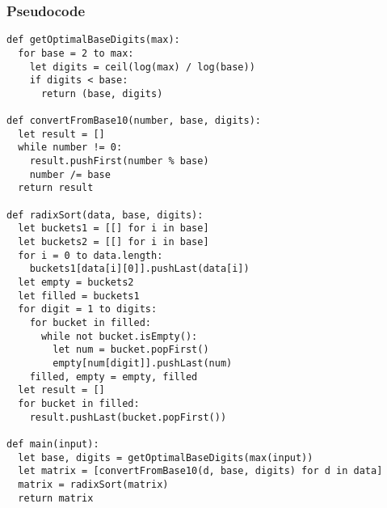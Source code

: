 \documentclass[letterpaper, 12pt]{math}
\begin{document}
\subsubsection*{Pseudocode}
\begin{lstlisting}
def getOptimalBaseDigits(max):
  for base = 2 to max:
    let digits = ceil(log(max) / log(base))
    if digits < base:
      return (base, digits)

def convertFromBase10(number, base, digits):
  let result = []
  while number != 0:
    result.pushFirst(number % base)
    number /= base
  return result

def radixSort(data, base, digits):
  let buckets1 = [[] for i in base]
  let buckets2 = [[] for i in base]
  for i = 0 to data.length:
    buckets1[data[i][0]].pushLast(data[i])
  let empty = buckets2
  let filled = buckets1
  for digit = 1 to digits:
    for bucket in filled:
      while not bucket.isEmpty():
        let num = bucket.popFirst()
        empty[num[digit]].pushLast(num)
    filled, empty = empty, filled
  let result = []
  for bucket in filled:
    result.pushLast(bucket.popFirst())

def main(input):
  let base, digits = getOptimalBaseDigits(max(input))
  let matrix = [convertFromBase10(d, base, digits) for d in data]
  matrix = radixSort(matrix)
  return matrix
\end{lstlisting}
\end{document}
